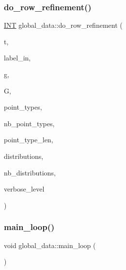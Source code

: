\subsubsection{\texorpdfstring{do\+\_\+row\+\_\+refinement()}{do\_row\_refinement()}\hspace{0.1cm}{\footnotesize\ttfamily [2/2]}}
{\footnotesize\ttfamily \mbox{\hyperlink{galois_8h_a09fddde158a3a20bd2dcadb609de11dc}{I\+NT}} global\+\_\+data\+::do\+\_\+row\+\_\+refinement (\begin{DoxyParamCaption}\item[{\mbox{\hyperlink{galois_8h_a09fddde158a3a20bd2dcadb609de11dc}{I\+NT}}}]{t,  }\item[{\mbox{\hyperlink{galois_8h_ab6cc7b4aeb6ea31aba2b3fbfc83ff5e6}{B\+Y\+TE}} $\ast$}]{label\+\_\+in,  }\item[{ofstream \&}]{g,  }\item[{\mbox{\hyperlink{classtdo__scheme}{tdo\+\_\+scheme}} \&}]{G,  }\item[{\mbox{\hyperlink{galois_8h_a09fddde158a3a20bd2dcadb609de11dc}{I\+NT}} $\ast$}]{point\+\_\+types,  }\item[{\mbox{\hyperlink{galois_8h_a09fddde158a3a20bd2dcadb609de11dc}{I\+NT}}}]{nb\+\_\+point\+\_\+types,  }\item[{\mbox{\hyperlink{galois_8h_a09fddde158a3a20bd2dcadb609de11dc}{I\+NT}}}]{point\+\_\+type\+\_\+len,  }\item[{\mbox{\hyperlink{galois_8h_a09fddde158a3a20bd2dcadb609de11dc}{I\+NT}} $\ast$}]{distributions,  }\item[{\mbox{\hyperlink{galois_8h_a09fddde158a3a20bd2dcadb609de11dc}{I\+NT}}}]{nb\+\_\+distributions,  }\item[{\mbox{\hyperlink{galois_8h_a09fddde158a3a20bd2dcadb609de11dc}{I\+NT}}}]{verbose\+\_\+level }\end{DoxyParamCaption})}

\mbox{\label{classglobal__data_abc6a1a7965a5dc2f8819f78aca590e84}} 
\subsubsection{\texorpdfstring{main\+\_\+loop()}{main\_loop()}}
{\footnotesize\ttfamily void global\+\_\+data\+::main\+\_\+loop (\begin{DoxyParamCaption}{ }\end{DoxyParamCaption})}

